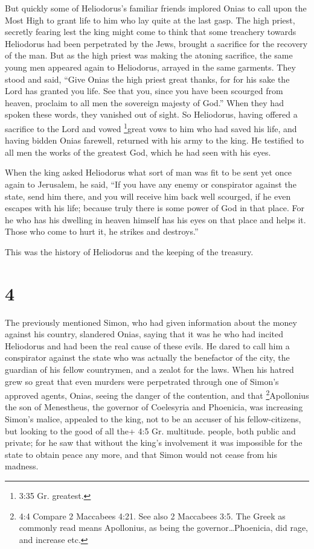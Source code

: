  But quickly some of Heliodorus's familiar friends implored
Onias to call upon the Most High to grant life to him who lay quite at
the last gasp.  The high priest, secretly fearing lest the
king might come to think that some treachery towards Heliodorus had been
perpetrated by the Jews, brought a sacrifice for the recovery of the
man.  But as the high priest was making the atoning
sacrifice, the same young men appeared again to Heliodorus, arrayed in
the same garments. They stood and said, ``Give Onias the high priest
great thanks, for for his sake the Lord has granted you life.
 See that you, since you have been scourged from heaven,
proclaim to all men the sovereign majesty of God.'' When they had spoken
these words, they vanished out of sight.  So Heliodorus,
having offered a sacrifice to the Lord and vowed \footnote{3:35 Gr.
  greatest.}great vows to him who had saved his life, and having bidden
Onias farewell, returned with his army to the king.  He
testified to all men the works of the greatest God, which he had seen
with his eyes.

 When the king asked Heliodorus what sort of man was fit to
be sent yet once again to Jerusalem, he said,  ``If you
have any enemy or conspirator against the state, send him there, and you
will receive him back well scourged, if he even escapes with his life;
because truly there is some power of God in that place. 
For he who has his dwelling in heaven himself has his eyes on that place
and helps it. Those who come to hurt it, he strikes and destroys.''

 This was the history of Heliodorus and the keeping of the
treasury.

\hypertarget{section-3}{%
\section{4}\label{section-3}}

 The previously mentioned Simon, who had given information
about the money against his country, slandered Onias, saying that it was
he who had incited Heliodorus and had been the real cause of these
evils.  He dared to call him a conspirator against the state
who was actually the benefactor of the city, the guardian of his fellow
countrymen, and a zealot for the laws.  When his hatred grew
so great that even murders were perpetrated through one of Simon's
approved agents,  Onias, seeing the danger of the
contention, and that \footnote{4:4 Compare 2 Maccabees 4:21. See also 2
  Maccabees 3:5. The Greek as commonly read means Apollonius, as being
  the governor\ldots Phoenicia, did rage, and increase etc.}Apollonius
the son of Menestheus, the governor of Coelesyria and Phoenicia, was
increasing Simon's malice,  appealed to the king, not to be
an accuser of his fellow-citizens, but looking to the good of all the+
4:5 Gr. multitude. people, both public and private;  for he
saw that without the king's involvement it was impossible for the state
to obtain peace any more, and that Simon would not cease from his
madness.


